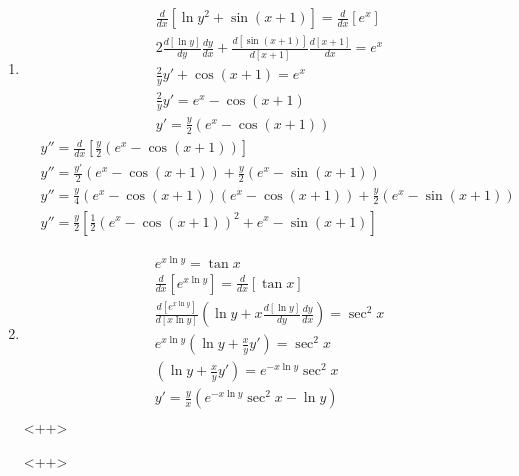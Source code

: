 \documentclass[10pt,letterpaper]{hwset}
\begin{document}
\begin{enumerate}
	\item \begin{solution}
		\begin{align*}
			&\frac{d}{dx}\left[ \ln y^2 + \sin(x+1) \right] = \frac{d}{dx}\left[ e^x
				\right]\\
			&2\frac{d\left[\ln y\right]}{dy}\frac{dy}{dx} + \frac{d\left[ \sin(x+1)
				\right]}{d\left[ x+1 \right]}\frac{d\left[ x+1 \right]}{dx} = e^x \\
			&\frac{2}{y}y' + \cos(x+1) = e^x \\
			&\frac{2}{y}y' = e^x - \cos(x+1) \\
			&\boxed{y' = \frac{y}{2}\left( e^x - \cos(x+1) \right)}
		\end{align*}
		\begin{align*}
			&y'' = \frac{d}{dx}\left[ \frac{y}{2}\left( e^x - \cos(x+1) \right) \right]\\
			&y'' = \frac{y'}{2}\left( e^x - \cos(x+1) \right) + \frac{y}{2}\left( e^x
				- \sin(x+1) \right) \\
			&y'' = \frac{y}{4}\left( e^x - \cos(x+1) \right)\left( e^x - \cos(x+1)
				\right) + \frac{y}{2}\left( e^x - \sin(x+1) \right) \\
			&\boxed{y'' = \frac{y}{2}\left[\frac{1}{2}\left( e^x - \cos(x+1) \right)^2
				+ e^x - \sin(x+1) \right]}
		\end{align*}
	\end{solution}
	\item \begin{solution}
		\begin{align*}
			&e^{x \ln y} = \tan x \\
			&\frac{d}{dx}\left[ e^{x \ln y} \right] = \frac{d}{dx}\left[ \tan x
				\right] \\
			&\frac{d\left[ e^{x \ln y} \right]}{d\left[ x \ln y \right]}\left( \ln y +
				x\frac{d\left[ \ln y \right]}{dy}\frac{dy}{dx} \right)  = \sec^2 x\\
			& e^{x \ln y}\left( \ln y + \frac{x}{y} y' \right)  = \sec^2 x\\
			& \left( \ln y + \frac{x}{y} y' \right)  = e^{-x \ln y}\sec^2 x\\
			& \boxed{y' = \frac{y}{x} \left( e^{-x \ln y}\sec^2 x - \ln y \right)} \\
		\end{align*}<++>
	\end{solution}<++>
\end{enumerate}
\end{document}
